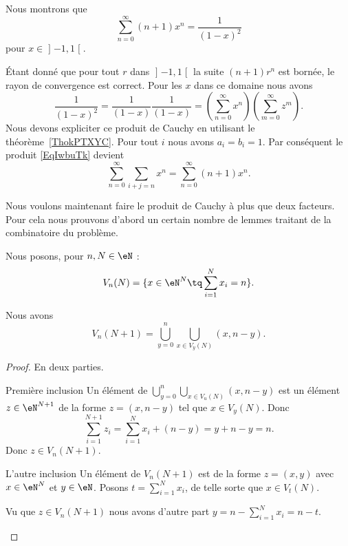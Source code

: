 \begin{example}
	Nous montrons que
	\begin{equation}
		\sum_{n=0}^{\infty}(n+1)x^n=\frac{1}{ (1-x)^2 }
	\end{equation}
	pour \( x\in\mathopen] -1 , 1 \mathclose[\).

		Étant donné que pour tout \( r\) dans \( \mathopen] -1 , 1 \mathclose[\) la suite \( (n+1)r^n\) est bornée, le rayon de convergence est correct. Pour les \( x\) dans ce domaine nous avons
	\begin{equation}        \label{EqIwbuTk}
		\frac{1}{ (1-x)^2 }=\frac{1}{ (1-x) }\frac{1}{ (1-x) }=\left( \sum_{n=0}^{\infty}x^n \right)\left( \sum_{m=0}^{\infty}z^m \right).
	\end{equation}
	Nous devons expliciter ce produit de Cauchy en utilisant le théorème~\ref{ThokPTXYC}. Pour tout \( i\) nous avons \( a_i=b_i=1\). Par conséquent le produit \eqref{EqIwbuTk} devient
	\begin{equation}
		\sum_{n=0}^{\infty}\sum_{i+j=n}x^n=\sum_{n=0}^{\infty}(n+1)x^n.
	\end{equation}
\end{example}

Nous voulons maintenant faire le produit de Cauchy à plus que deux facteurs. Pour cela nous prouvons d'abord un certain nombre de lemmes traitant de la combinatoire du problème.

Nous posons, pour \( n,N\in \eN\) :
\begin{equation}        \label{EQooJCBSooMSbaCd}
	V_n(N)=\{ x\in \eN^N\tq \sum_{i=1}^Nx_i=n \}.
\end{equation}

\begin{lemma}       \label{LEMooRKEVooDdpuHt}
	Nous avons
	\begin{equation}
		V_n(N+1)=\bigcup_{y=0}^n\bigcup_{x\in V_y(N)}(x,n-y).
	\end{equation}
\end{lemma}

\begin{proof}
	En deux parties.
	\begin{subproof}
		\item[Première inclusion]
		Un élément de \( \bigcup_{y=0}^n\bigcup_{x\in V_u(N)}(x,n-y)\) est un élément \( z\in \eN^{N+1}\) de la forme \( z=(x,n-y)\) tel que \( x\in V_y(N)\). Donc
		\begin{equation}
			\sum_{i=1}^{N+1}z_i=\sum_{i=1}^Nx_i+(n-y)=y+n-y=n.
		\end{equation}
		Donc \( z\in V_n(N+1)\).
		\begin{subproof}
			\item[L'autre inclusion]
			Un élément de \( V_n(N+1)\) est de la forme \( z=(x,y)\) avec \( x\in \eN^N\) et \( y\in \eN\). Posons \( t=\sum_{i=1}^Nx_i\), de telle sorte que \( x\in V_t(N)\).

			Vu que \( z\in V_n(N+1)\) nous avons d'autre part \( y=n-\sum_{i=1}^Nx_i=n-t\).
		\end{subproof}
	\end{subproof}
\end{proof}

